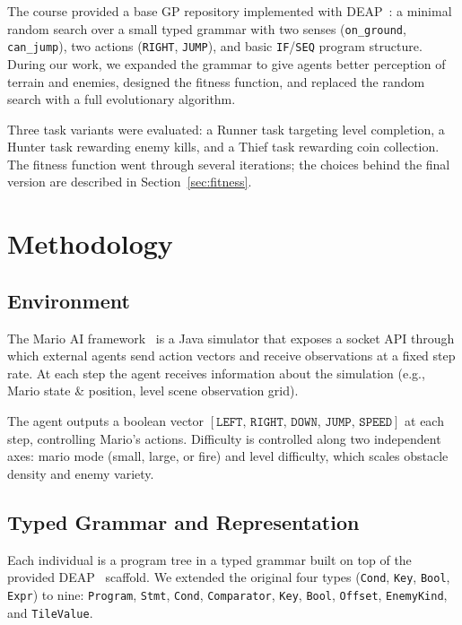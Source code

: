 \documentclass[runningheads]{llncs}
\begin{document}
The course provided a base GP repository implemented with DEAP~\cite{fortin2012deap}: a minimal random search over a small typed grammar with two senses (\texttt{on\_ground}, \texttt{can\_jump}), two actions (\texttt{RIGHT}, \texttt{JUMP}), and basic \texttt{IF}/\texttt{SEQ} program structure. During our work, we expanded the grammar to give agents better perception of terrain and enemies, designed the fitness function, and replaced the random search with a full evolutionary algorithm.

Three task variants were evaluated: a Runner task targeting level completion, a Hunter task rewarding enemy kills, and a Thief task rewarding coin collection. The fitness function went through several iterations; the choices behind the final version are described in Section~\ref{sec:fitness}.

\section{Methodology}
\label{sec:method}

\subsection{Environment}
\label{sec:env}

The Mario AI framework~\cite{togelius2009mario} is a Java simulator that exposes a socket API through which external agents send action vectors and receive observations at a fixed step rate. At each step the agent receives information about the simulation (e.g., Mario state \& position, level scene observation grid).

The agent outputs a boolean vector $[\texttt{LEFT},\,\texttt{RIGHT},\,\texttt{DOWN},\,\texttt{JUMP},\,\texttt{SPEED}]$ at each step, controlling Mario's actions. Difficulty is controlled along two independent axes: mario mode (small, large, or fire) and level difficulty, which scales obstacle density and enemy variety.

\subsection{Typed Grammar and Representation}
\label{sec:grammar}

Each individual is a program tree in a typed grammar built on top of the provided DEAP~\cite{fortin2012deap} scaffold. We extended the original four types (\texttt{Cond}, \texttt{Key}, \texttt{Bool}, \texttt{Expr}) to nine: \texttt{Program}, \texttt{Stmt}, \texttt{Cond}, \texttt{Comparator}, \texttt{Key}, \texttt{Bool}, \texttt{Offset}, \texttt{EnemyKind}, and \texttt{TileValue}.
\end{document}
